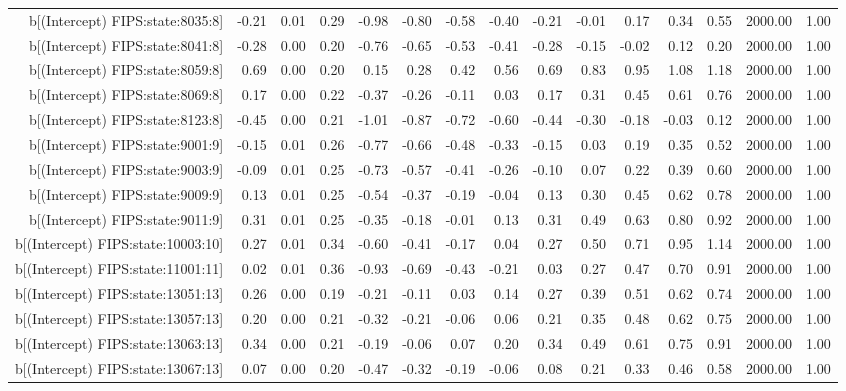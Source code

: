 \begin{table}[ht]
\begin{tabular}{rrrrrrrrrrrrrrr}
  b[(Intercept) FIPS:state:8035:8] & -0.21 & 0.01 & 0.29 & -0.98 & -0.80 & -0.58 & -0.40 & -0.21 & -0.01 & 0.17 & 0.34 & 0.55 & 2000.00 & 1.00 \\ 
  b[(Intercept) FIPS:state:8041:8] & -0.28 & 0.00 & 0.20 & -0.76 & -0.65 & -0.53 & -0.41 & -0.28 & -0.15 & -0.02 & 0.12 & 0.20 & 2000.00 & 1.00 \\ 
  b[(Intercept) FIPS:state:8059:8] & 0.69 & 0.00 & 0.20 & 0.15 & 0.28 & 0.42 & 0.56 & 0.69 & 0.83 & 0.95 & 1.08 & 1.18 & 2000.00 & 1.00 \\ 
  b[(Intercept) FIPS:state:8069:8] & 0.17 & 0.00 & 0.22 & -0.37 & -0.26 & -0.11 & 0.03 & 0.17 & 0.31 & 0.45 & 0.61 & 0.76 & 2000.00 & 1.00 \\ 
  b[(Intercept) FIPS:state:8123:8] & -0.45 & 0.00 & 0.21 & -1.01 & -0.87 & -0.72 & -0.60 & -0.44 & -0.30 & -0.18 & -0.03 & 0.12 & 2000.00 & 1.00 \\ 
  b[(Intercept) FIPS:state:9001:9] & -0.15 & 0.01 & 0.26 & -0.77 & -0.66 & -0.48 & -0.33 & -0.15 & 0.03 & 0.19 & 0.35 & 0.52 & 2000.00 & 1.00 \\ 
  b[(Intercept) FIPS:state:9003:9] & -0.09 & 0.01 & 0.25 & -0.73 & -0.57 & -0.41 & -0.26 & -0.10 & 0.07 & 0.22 & 0.39 & 0.60 & 2000.00 & 1.00 \\ 
  b[(Intercept) FIPS:state:9009:9] & 0.13 & 0.01 & 0.25 & -0.54 & -0.37 & -0.19 & -0.04 & 0.13 & 0.30 & 0.45 & 0.62 & 0.78 & 2000.00 & 1.00 \\ 
  b[(Intercept) FIPS:state:9011:9] & 0.31 & 0.01 & 0.25 & -0.35 & -0.18 & -0.01 & 0.13 & 0.31 & 0.49 & 0.63 & 0.80 & 0.92 & 2000.00 & 1.00 \\ 
  b[(Intercept) FIPS:state:10003:10] & 0.27 & 0.01 & 0.34 & -0.60 & -0.41 & -0.17 & 0.04 & 0.27 & 0.50 & 0.71 & 0.95 & 1.14 & 2000.00 & 1.00 \\ 
  b[(Intercept) FIPS:state:11001:11] & 0.02 & 0.01 & 0.36 & -0.93 & -0.69 & -0.43 & -0.21 & 0.03 & 0.27 & 0.47 & 0.70 & 0.91 & 2000.00 & 1.00 \\ 
  b[(Intercept) FIPS:state:13051:13] & 0.26 & 0.00 & 0.19 & -0.21 & -0.11 & 0.03 & 0.14 & 0.27 & 0.39 & 0.51 & 0.62 & 0.74 & 2000.00 & 1.00 \\ 
  b[(Intercept) FIPS:state:13057:13] & 0.20 & 0.00 & 0.21 & -0.32 & -0.21 & -0.06 & 0.06 & 0.21 & 0.35 & 0.48 & 0.62 & 0.75 & 2000.00 & 1.00 \\ 
  b[(Intercept) FIPS:state:13063:13] & 0.34 & 0.00 & 0.21 & -0.19 & -0.06 & 0.07 & 0.20 & 0.34 & 0.49 & 0.61 & 0.75 & 0.91 & 2000.00 & 1.00 \\ 
  b[(Intercept) FIPS:state:13067:13] & 0.07 & 0.00 & 0.20 & -0.47 & -0.32 & -0.19 & -0.06 & 0.08 & 0.21 & 0.33 & 0.46 & 0.58 & 2000.00 & 1.00 \\ 

\end{tabular}
\end{table}
